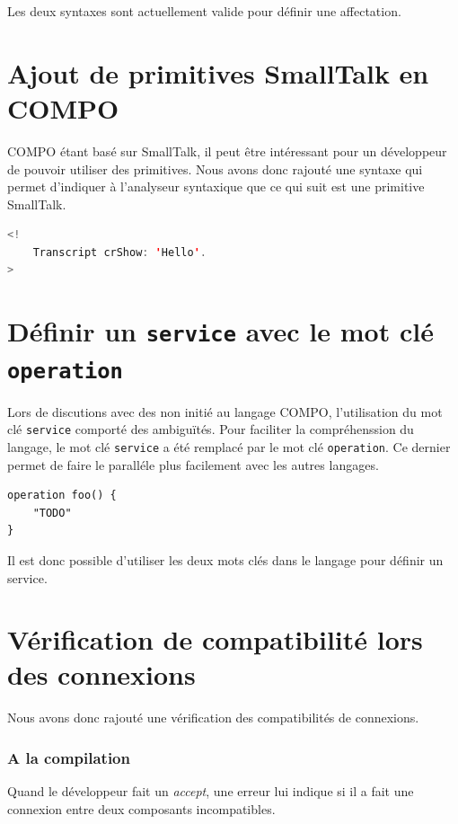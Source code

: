 \documentclass[11pt,a4paper,openany,oneside]{book}
\begin{document}
Les deux syntaxes sont actuellement valide pour définir une affectation.

\section{Ajout de primitives SmallTalk en COMPO}

COMPO étant basé sur SmallTalk, il peut être intéressant pour un développeur de pouvoir utiliser des primitives.
Nous avons donc rajouté une syntaxe qui permet d'indiquer à l'analyseur syntaxique que ce qui suit est une primitive SmallTalk. 

\begin{lstlisting}[language=JAVA, frame=single, caption=Syntaxe d'une primitive smalltalk en COMPO]
<! 
    Transcript crShow: 'Hello'.
>
\end{lstlisting}

\section{Définir un \texttt{service} avec le mot clé \texttt{operation} }

Lors de discutions avec des non initié au langage COMPO, l'utilisation du mot clé \texttt{service} comporté des ambiguïtés. Pour faciliter la compréhenssion du langage, le mot clé \texttt{service} a été remplacé par le mot clé \texttt{operation}. Ce dernier permet de faire le paralléle plus facilement avec les autres langages.

\begin{lstlisting}[language=COMPO, frame=single, caption=Syntaxe d'une opération en COMPO]
operation foo() {
    "TODO"
}
\end{lstlisting}

Il est donc possible d'utiliser les deux mots clés dans le langage pour définir un service.


\section{Vérification de compatibilité lors des connexions}

Nous avons donc rajouté une vérification des compatibilités de connexions.

\subsubsection{A la compilation}

Quand le développeur fait un \textit{accept}, une erreur lui indique si il a fait une connexion entre deux composants incompatibles.
\end{document}
